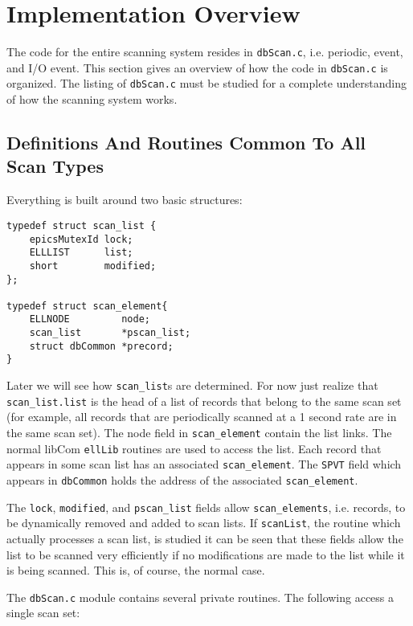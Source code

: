 \section{Implementation Overview}

The code for the entire scanning system resides in \verb|dbScan.c|, i.e. periodic, event, and I/O event.
This section gives an overview of how the code in \verb|dbScan.c| is organized.
The listing of \verb|dbScan.c| must be studied for a complete understanding of how the scanning system works.

\subsection{Definitions And Routines Common To All Scan Types}

Everything is built around two basic structures:

\begin{verbatim}
typedef struct scan_list {
    epicsMutexId lock;
    ELLLIST      list;
    short        modified;
};

typedef struct scan_element{
    ELLNODE         node;
    scan_list       *pscan_list;
    struct dbCommon *precord;
}
\end{verbatim}

Later we will see how \verb|scan_list|s are determined.
For now just realize that \verb|scan_list.list| is the head of a list of records that belong to the same scan set (for example, all records that are periodically scanned at a 1 second rate are in the same scan set).
The node field in \verb|scan_element| contain the list links.
The normal libCom \verb|ellLib| routines are used to access the list.
Each record that appears in some scan list has an associated \verb|scan_element|.
The \verb|SPVT| field which appears in \verb|dbCommon| holds the address of the associated \verb|scan_element|.

The \verb|lock|, \verb|modified|, and \verb|pscan_list| fields allow \verb|scan_elements|, i.e. records, to be dynamically removed and added to scan lists.
If \verb|scanList|, the routine which actually processes a scan list, is studied it can be seen that these fields allow the list to be scanned very efficiently if no modifications are made to the list while it is being scanned.
This is, of course, the normal case.

The \verb|dbScan.c| module contains several private routines. The following access a single scan set: 

